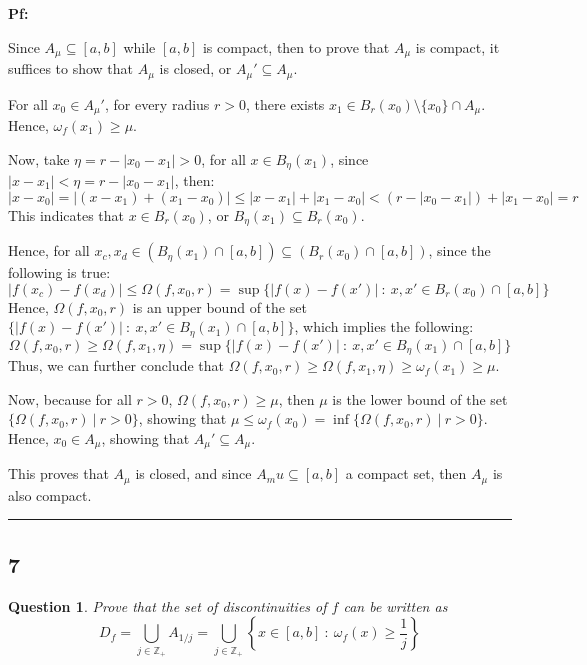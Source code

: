\documentclass{article}
\newtheorem{question}{Question}
\begin{document}
\textbf{Pf:}

Since $A_\mu \subseteq [a,b]$ while $[a,b]$ is compact, then to prove that $A_\mu$ is compact, it suffices to show that $A_\mu$ is closed, or $A_\mu'\subseteq A_\mu$.

\hfill

For all $x_0\in A_\mu'$, for every radius $r>0$, there exists $x_1\in B_r(x_0)\setminus\{x_0\}\cap A_\mu$. Hence, $\omega_f(x_1)\geq \mu$.

Now, take $\eta = r-|x_0-x_1|>0$, for all $x\in B_\eta(x_1)$, since $|x-x_1|<\eta = r-|x_0-x_1|$, then:
$$|x-x_0|=|(x-x_1)+(x_1-x_0)|\leq |x-x_1|+|x_1-x_0| < (r-|x_0-x_1|)+|x_1-x_0| = r$$
This indicates that $x\in B_r(x_0)$, or $B_\eta(x_1)\subseteq B_r(x_0)$.

Hence, for all $x_c,x_d\in (B_\eta(x_1)\cap [a,b])\subseteq (B_r(x_0)\cap [a,b])$, since the following is true: 
$$|f(x_c)-f(x_d)|\leq \Omega(f,x_0,r)=\sup\{|f(x)-f(x')|\ :\ x,x'\in B_r(x_0)\cap [a,b]\}$$
Hence, $\Omega(f,x_0,r)$ is an upper bound of the set $\{|f(x)-f(x')|\ :\ x,x'\in B_\eta(x_1)\cap [a,b]\}$, which implies the following:
$$\Omega(f,x_0,r)\geq \Omega(f,x_1,\eta)=\sup\{|f(x)-f(x')|\ :\ x,x'\in B_\eta(x_1)\cap [a,b]\}$$
Thus, we can further conclude that $\Omega(f,x_0,r)\geq \Omega(f,x_1,\eta)\geq \omega_f(x_1) \geq \mu$.

\hfill

Now, because for all $r>0$, $\Omega(f,x_0,r)\geq \mu$, then $\mu$ is the lower bound of the set $\{\Omega(f,x_0,r)\ |\ r>0\}$, 
showing that $\mu \leq \omega_f(x_0)=\inf\{\Omega(f,x_0,r)\ |\ r>0\}$. Hence, $x_0 \in A_\mu$, showing that $A_\mu'\subseteq A_\mu$.

This proves that $A_\mu$ is closed, and since $A_mu\subseteq[a,b]$ a compact set, then $A_\mu$ is also compact.

\hfill

\rule{15.5cm}{0.1mm}

\hfill

\subsection*{7}
\begin{myBox2}[]{}
    \begin{question}
        Prove that the set of discontinuities of $f$ can be written as
        $$D_f=\bigcup_{j\in\mathbb{Z}_+}A_{1/j}=\bigcup_{j\in\mathbb{Z}_+}\left\{x\in[a,b]\ :\ \omega_f(x)\geq \frac{1}{j}\right\}$$
    \end{question}
\end{myBox2}
\end{document}
